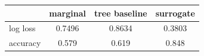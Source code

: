 \begin{tabular}{lccc}
\toprule
 & marginal & tree baseline & surrogate \\
\midrule
log loss & 0.7496 & 0.8634 & 0.3803 \\
accuracy & 0.579 & 0.619 & 0.848 \\
\bottomrule
\end{tabular}
